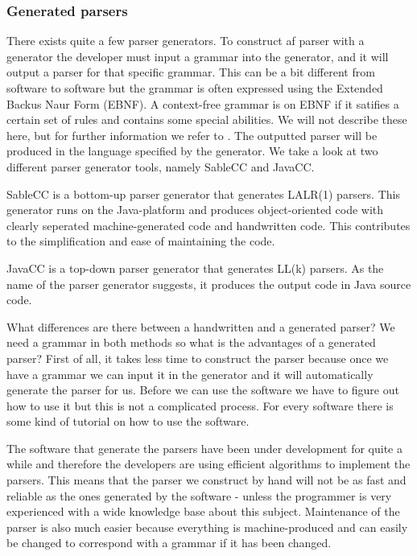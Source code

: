 \subsubsection{Generated parsers}
\label{subsec:generatedparsers}
There exists quite a few parser generators. To construct af parser with a generator 
the developer must input a grammar into the generator, and it will output a parser 
for that specific grammar. This can be a bit different from software to software but the grammar is often expressed
using the Extended Backus Naur Form (EBNF). A context-free grammar is on EBNF if it
satifies a certain set of rules and contains some special abilities. We will not describe
these here, but for further information we refer to \cite[152]{fischer2009}. The outputted parser will be
produced in the language specified by the generator. We take a look at two different parser
generator tools, namely SableCC and JavaCC.

SableCC is a bottom-up parser generator that generates LALR(1) parsers. This
generator runs on the Java-platform and produces object-oriented code with
clearly seperated machine-generated code and handwritten code. This contributes
to the simplification and ease of maintaining the code.\cite[pp. 11]{sableccdoc}

JavaCC is a top-down parser generator that generates LL(k) parsers. As the name
of the parser generator suggests, it produces the output code in Java source
code.\cite{wiki-javacc}

What differences are there between a handwritten and a generated parser? We need
a grammar in both methods so what is the advantages of a generated parser? First
of all, it takes less time to construct the parser because once we have a
grammar we can input it in the generator and it will automatically generate the
parser for us. Before we can use the software we have to figure out how to use
it but this is not a complicated process. For every software there is some kind
of tutorial on how to use the software.

The software that generate the parsers have been under development for quite a
while and therefore the developers are using efficient algorithms to implement
the parsers. This means that the parser we construct by hand will not be as fast
and reliable as the ones generated by the software - unless the programmer is
very experienced with a wide knowledge base about this subject. Maintenance of the 
parser is also much easier because everything is machine-produced and can easily be 
changed to correspond with a grammar if it has been changed.

